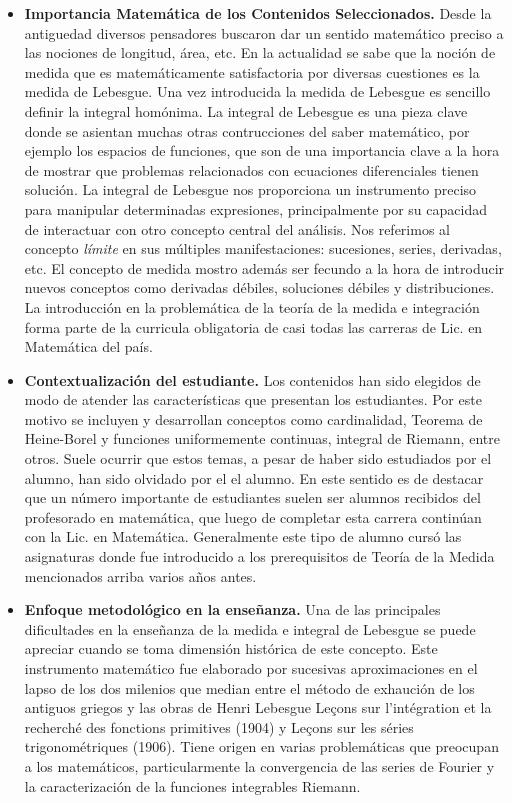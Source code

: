 \documentclass[a4paper, 12pt]{article}
\begin{document}
\begin{itemize}
 \item \textbf{Importancia Matemática de los Contenidos Seleccionados.}  Desde la antiguedad diversos pensadores buscaron dar un sentido matemático preciso  a las nociones de   longitud, área, etc. En la actualidad se sabe que la noción de medida que es matemáticamente satisfactoria por diversas cuestiones es la medida de Lebesgue. Una vez introducida la medida de Lebesgue es sencillo definir la integral homónima.   La integral de Lebesgue es una pieza clave donde se asientan  muchas otras contrucciones del saber matemático, por ejemplo los espacios de funciones, que son de una importancia clave a la hora de mostrar que problemas  relacionados con ecuaciones diferenciales tienen solución. La integral de Lebesgue nos proporciona  un instrumento preciso para manipular determinadas expresiones, principalmente por su capacidad de interactuar con otro  concepto central del análisis. Nos referimos al concepto \emph{límite} en sus múltiples manifestaciones: sucesiones, series, derivadas, etc. El concepto de medida mostro además ser fecundo a la hora de introducir nuevos conceptos como derivadas débiles, soluciones débiles y distribuciones. 
 La introducción en la problemática de  la teoría de la medida e integración forma parte de la curricula obligatoria de casi todas las carreras de Lic. en Matemática del país.
 
\item \textbf{Contextualización del estudiante.} Los contenidos han sido elegidos de modo de atender las características que presentan los estudiantes. Por este motivo se  incluyen y desarrollan conceptos como cardinalidad, Teorema de Heine-Borel y funciones uniformemente continuas, integral de Riemann, entre otros. Suele ocurrir que estos temas, a pesar de haber sido estudiados por el alumno,  han sido olvidado por el el alumno. En este sentido es de destacar que un número importante de estudiantes suelen ser alumnos recibidos del profesorado en matemática, que luego de completar esta carrera continúan con la Lic. en Matemática. Generalmente este tipo de alumno cursó las asignaturas donde fue introducido a los prerequisitos de Teoría de la Medida mencionados arriba  varios años antes.



\item \textbf{Enfoque metodológico en la enseñanza.} Una de las principales dificultades en la enseñanza  de la medida e integral de Lebesgue se puede apreciar cuando se toma dimensión histórica de este concepto.  Este instrumento matemático fue elaborado por sucesivas aproximaciones en el lapso de los dos milenios que median entre el método de exhaución de los antiguos griegos y las obras de Henri Lebesgue Leçons sur l'intégration et la recherché des fonctions primitives (1904) y Leçons sur les séries trigonométriques (1906). Tiene origen en varias problemáticas que preocupan a los matemáticos, particularmente  la convergencia de las series de Fourier y la caracterización de la funciones integrables Riemann. 


\end{itemize}
\end{document}
